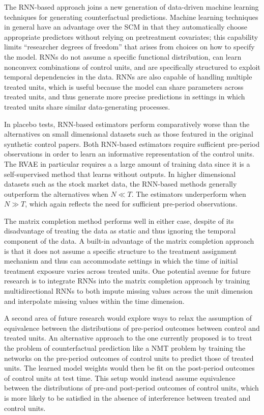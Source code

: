 \documentclass[hidelinks,12pt]{article}
\begin{document}
The RNN-based approach joins a new generation of data-driven machine learning techniques for generating counterfactual predictions. Machine learning techniques in general have an advantage over the SCM in that they automatically choose appropriate predictors without relying on pretreatment covariates; this capability limits ``researcher degrees of freedom'' that arises from choices on how to specify the model. RNNs do not assume a specific functional distribution, can learn nonconvex combinations of control units, and are specifically structured to exploit temporal dependencies in the data. RNNs are also capable of handling multiple treated units, which is useful because the model can share parameters across treated units, and thus generate more precise predictions in settings in which treated units share similar data-generating processes. 

In placebo tests, RNN-based estimators perform comparatively worse than the alternatives on small dimensional datasets such as those featured in the original synthetic control papers. Both RNN-based estimators require sufficient pre-period observations in order to learn an informative representation of the control units. The RVAE in particular requires a a large amount of training data since it is a self-supervised method that learns without outputs. In higher dimensional datasets such as the stock market data, the RNN-based methods generally outperform the alternatives when  $N \ll T$. The estimators underperform when $N \gg T$, which again reflects the need for sufficient pre-period observations. 

The matrix completion method performs well in either case, despite of its disadvantage of treating the data as static and thus ignoring the temporal component of the data. A built-in advantage of the matrix completion approach is that it does not assume a specific structure to the treatment assignment mechanism and thus can accommodate settings in which the time of initial treatment exposure varies across treated units. One potential avenue for future research is to integrate RNNs into the matrix completion approach by training multidirectional RNNs \citep[e.g.,][]{yoon2018estimating} to both impute missing values across the unit dimension and interpolate missing values within the time dimension. 

A second area of future research would explore ways to relax the assumption of equivalence between the distributions of pre-period outcomes between control and treated units. An alternative approach to the one currently proposed is to treat the problem of counterfactual prediction like a NMT problem by training the networks on the pre-period outcomes of control units to predict those of treated units. The learned model weights would then be fit on the post-period outcomes of control units at test time. This setup would instead assume equivalence between the distributions of pre-and post-period outcomes of control units, which is more likely to be satisfied in the absence of interference between treated and control units. 
\end{document}
